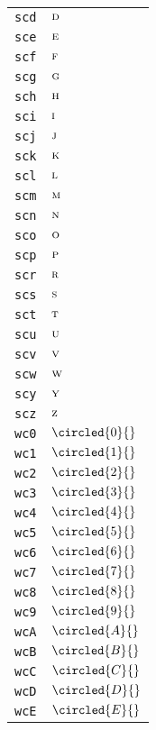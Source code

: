 \begin{longtable}{ll}
\texttt{scd}&${}{\textsc{d}}{}$\\
\texttt{sce}&${}{\textsc{e}}{}$\\
\texttt{scf}&${}{\textsc{f}}{}$\\
\texttt{scg}&${}{\textsc{g}}{}$\\
\texttt{sch}&${}{\textsc{h}}{}$\\
\texttt{sci}&${}{\textsc{i}}{}$\\
\texttt{scj}&${}{\textsc{j}}{}$\\
\texttt{sck}&${}{\textsc{k}}{}$\\
\texttt{scl}&${}{\textsc{l}}{}$\\
\texttt{scm}&${}{\textsc{m}}{}$\\
\texttt{scn}&${}{\textsc{n}}{}$\\
\texttt{sco}&${}{\textsc{o}}{}$\\
\texttt{scp}&${}{\textsc{p}}{}$\\
\texttt{scr}&${}{\textsc{r}}{}$\\
\texttt{scs}&${}{\textsc{s}}{}$\\
\texttt{sct}&${}{\textsc{t}}{}$\\
\texttt{scu}&${}{\textsc{u}}{}$\\
\texttt{scv}&${}{\textsc{v}}{}$\\
\texttt{scw}&${}{\textsc{w}}{}$\\
\texttt{scy}&${}{\textsc{y}}{}$\\
\texttt{scz}&${}{\textsc{z}}{}$\\
\texttt{wc0}&${}\circled{0}{}$\\
\texttt{wc1}&${}\circled{1}{}$\\
\texttt{wc2}&${}\circled{2}{}$\\
\texttt{wc3}&${}\circled{3}{}$\\
\texttt{wc4}&${}\circled{4}{}$\\
\texttt{wc5}&${}\circled{5}{}$\\
\texttt{wc6}&${}\circled{6}{}$\\
\texttt{wc7}&${}\circled{7}{}$\\
\texttt{wc8}&${}\circled{8}{}$\\
\texttt{wc9}&${}\circled{9}{}$\\
\texttt{wcA}&${}\circled{A}{}$\\
\texttt{wcB}&${}\circled{B}{}$\\
\texttt{wcC}&${}\circled{C}{}$\\
\texttt{wcD}&${}\circled{D}{}$\\
\texttt{wcE}&${}\circled{E}{}$\\

\end{longtable}
